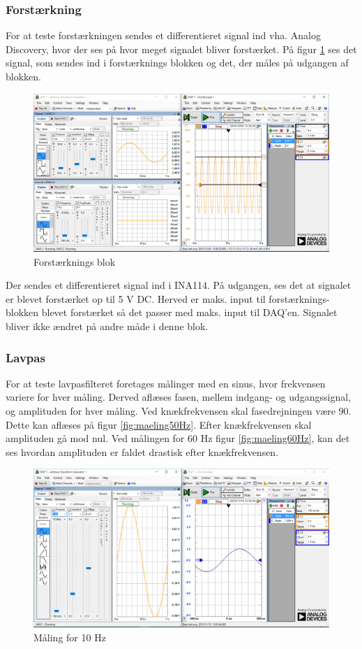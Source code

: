 \subsubsection{Forstærkning}
For at teste forstærkningen sendes et differentieret signal ind vha. Analog Discovery, hvor der ses på hvor meget signalet bliver forstærket. 
På figur \ref{fig:forstaerkning} ses det signal, som sendes ind i forstærknings blokken og det, der måles på udgangen af blokken. 
\begin{figure}[H]
	\centering
	\includegraphics[width=1.0\textwidth]{Figurer/forst_blok}
	\caption{Forstærknings blok}
	\label{fig:forstaerkning}
\end{figure}
Der sendes et differentieret signal ind i INA114. På udgangen, ses det at signalet er blevet forstærket op til 5 V DC. Herved er maks. input til forstærknings-blokken blevet forstærket så det passer med maks. input til DAQ'en. Signalet bliver ikke ændret på andre måde i denne blok.

\subsubsection{Lavpas}
For at teste lavpasfilteret foretages målinger med en sinus, hvor frekvensen variere for hver måling. Derved aflæses fasen, mellem indgang- og udgangssignal, og amplituden for hver måling. 
Ved knækfrekvensen skal fasedrejningen være 90\textdegree. Dette kan aflæses på figur \ref{fig:maeling50Hz}.
Efter knækfrekvensen skal amplituden gå mod nul. Ved målingen for 60 Hz figur \ref{fig:maeling60Hz}, kan det ses hvordan amplituden er faldet drastisk efter knækfrekvensen. 
\begin{figure}[H]
	\centering
	\includegraphics[width=1.0\textwidth]{Figurer/10Hz}
	\caption{Måling for 10 Hz}
	\label{fig:maeling10Hz}
\end{figure}

